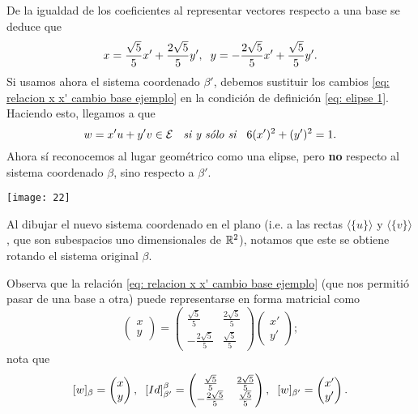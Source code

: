 \begin{ejem}
De la igualdad de los coeficientes al representar vectores respecto a una
base se deduce que 
\begin{equation}
	\label{eq: relacion x x' cambio base ejemplo}
	x = \frac{\sqrt{5}}{5} x' + \frac{2\sqrt{5}}{5} y', 
	\hspace{0.2cm}
	y =  -\frac{2\sqrt{5}}{5} x' + \frac{\sqrt{5}}{5}y'.
\end{equation}
Si usamos ahora el sistema coordenado $\beta'$, debemos sustituir 
los cambios \eqref{eq: relacion x x' cambio base ejemplo}
en la condición de definición \eqref{eq: elipse 1}. Haciendo esto, 
llegamos a que 
\begin{equation}
	\label{eq: elipse 2}
	w = x'u + y'v \in \mathcal{E} 
	\hspace{0.2cm} \textit{ si y sólo si }
	\hspace{0.2cm}
	6(x')^{2} + (y')^{2} = 1.
\end{equation}
Ahora sí reconocemos al lugar geométrico como una elipse, pero 
\textbf{no} respecto al sistema coordenado $\beta$, sino respecto 
a $\beta'$.
\begin{marginfigure}
\texttt{[image: 22]}
\end{marginfigure}

Al dibujar el nuevo sistema coordenado en el plano (i.e. a las 
rectas $\langle \{ u \} \rangle$ y $\langle \{ v \} \rangle$, que son 
subespacios uno dimensionales de $\mathbb{R}^{2}$), notamos que este se 
obtiene rotando el sistema original $\beta$.

Observa que la relación 
\eqref{eq: relacion x x' cambio base ejemplo}
(que nos permitió pasar de una base a otra) puede representarse
en forma matricial como 
\[
\begin{pmatrix}
x \\ y
\end{pmatrix} = 
\begin{pmatrix}
\frac{\sqrt{5}}{5} & \frac{2\sqrt{5}}{5} \\
-\frac{2\sqrt{5}}{5} & \frac{\sqrt{5}}{5}
\end{pmatrix}
\begin{pmatrix}
x' \\ y'
\end{pmatrix};
\]
nota que 
\[
[w]_{\beta} = \begin{pmatrix}
x \\ y
\end{pmatrix},
\hspace{0.2cm}
[Id]_{\beta'}^{\beta} = 
\begin{pmatrix}
\frac{\sqrt{5}}{5} & \frac{2\sqrt{5}}{5} \\
-\frac{2\sqrt{5}}{5} & \frac{\sqrt{5}}{5}
\end{pmatrix},
\hspace{0.2cm}
[w]_{\beta'} = \begin{pmatrix}
x' \\ y'
\end{pmatrix}.
\]
\end{ejem}

